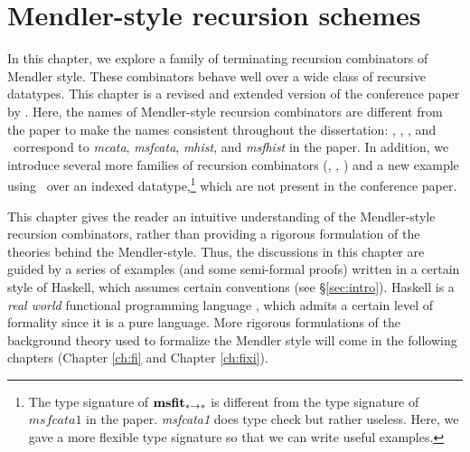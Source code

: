 \chapter{Mendler-style recursion schemes}\label{ch:mendler}
In this chapter, we explore a family of terminating recursion combinators
of Mendler style. These combinators behave well over a wide class of
recursive datatypes. This chapter is a revised and extended version of
the conference paper by \citet{AhnShe11}. Here, the names of Mendler-style
recursion combinators are different from the paper to make the names
consistent throughout the dissertation: \MIt, \MsfIt, \McvIt, and
\MsfcvIt\ correspond to \textit{mcata}, \textit{msfcata}, \textit{mhist},
and \textit{msfhist} in the paper. In addition, we introduce several
more families of recursion combinators (\MPr, \McvPr, \McvPr)
and a new example using \MsfIt\ over an indexed datatype,\footnote{
	The type signature of $\mathbf{msfit}_{* -> *}$ is different
	from the type signature of $\textit{msfcata1}$ in the paper. 
	\textit{msfcata1} does type check but rather useless.
	Here, we gave a more flexible type signature
	so that we can write useful examples.}
which are not present in the conference paper.

This chapter gives the reader an intuitive understanding of the Mendler-style
recursion combinators, rather than providing a rigorous formulation of
the theories behind the Mendler-style. Thus, the discussions in this chapter
are guided by a series of examples (and some semi-formal proofs) written
in a certain style of Haskell, which assumes certain conventions
(see \S\ref{sec:intro}).  Haskell is a \emph{real world}
functional programming language \cite{OSullivan08}, which admits
a certain level of formality since it is a pure language.
More rigorous formulations of the background theory used to formalize
the Mendler style will come in the following chapters
(Chapter \ref{ch:fi} and Chapter \ref{ch:fixi}).





